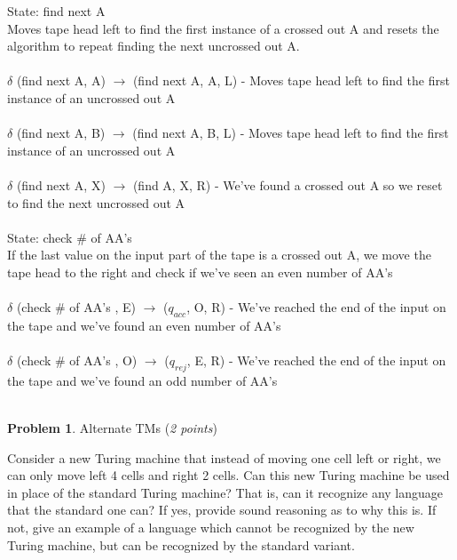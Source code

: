 \documentclass[11pt]{article}
\theoremstyle{definition}
\theoremstyle{theorem}
\newtheorem{prob}{Problem}
\begin{document}
\noindent State: find next A \\
Moves tape head left to find the first instance of a crossed out A and resets the algorithm to repeat finding the next uncrossed out A. \\ ~ \\
\noindent$\delta$ (find next A, A) $\rightarrow$ (find next A, A, L) - Moves tape head left to find the first instance of an uncrossed out A\\ ~ \\
\noindent$\delta$ (find next A, B) $\rightarrow$ (find next A, B, L) - Moves tape head left to find the first instance of an uncrossed out A\\ ~ \\
\noindent$\delta$ (find next A, X) $\rightarrow$ (find A, X, R) - We've found a crossed out A so we reset to find the next uncrossed out A\\ ~ \\

\noindent State: check $\#$ of AA's \\
If the last value on the input part of the tape is a crossed out A, we move the tape head to the right and check if we've seen an even number of AA's \\ ~ \\
\noindent$\delta$ (check $\#$ of AA's , E) $\rightarrow$ ($q_{acc}$, O, R) - We've reached the end of the input on the tape and we've found an even number of AA's \\ ~ \\
\noindent$\delta$ (check $\#$ of AA's , O) $\rightarrow$ ($q_{rej}$, E, R) - We've reached the end of the input on the tape and we've found an odd number of AA's \\ ~ \\

\newpage

\begin{prob} Alternate TMs (\emph{2 points})\end{prob}

Consider a new Turing machine that instead of moving one cell left or right, we can only move left 4 cells and right 2 cells. Can this new Turing machine be used in place of the standard Turing machine? That is, can it recognize any language that the standard one can? If yes, provide sound reasoning as to why this is. If not, give an example of a language which cannot be recognized by the new Turing machine, but can be recognized by the standard variant.
\end{document}
